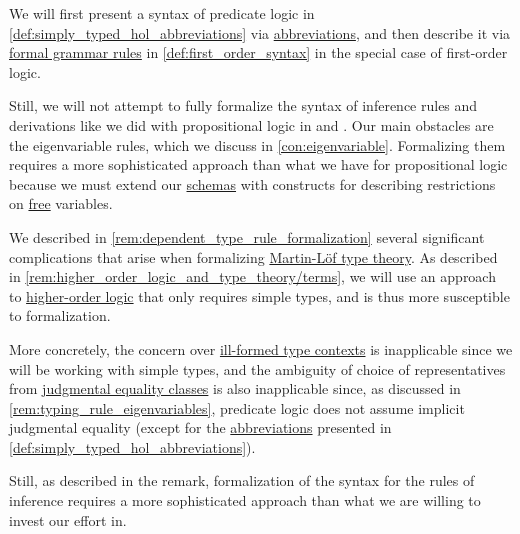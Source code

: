 \begin{remark}\label{rem:predicate_logic_formalization}
  We will first present a syntax of predicate logic in \cref{def:simply_typed_hol_abbreviations} via \hyperref[con:metalingual_abbreviation]{abbreviations}, and then describe it via \hyperref[def:formal_grammar]{formal grammar rules} in \cref{def:first_order_syntax} in the special case of first-order logic.

  Still, we will not attempt to fully formalize the syntax of inference rules and derivations like we did with propositional logic in  and . Our main obstacles are the eigenvariable rules, which we discuss in \cref{con:eigenvariable}. Formalizing them requires a more sophisticated approach than what we have for propositional logic because we must extend our \hyperref[con:schemas_and_instances]{schemas} with constructs for describing restrictions on \hyperref[con:variable_binding]{free} variables.
\end{remark}
\begin{comments}
  \item We described in \cref{rem:dependent_type_rule_formalization} several significant complications that arise when formalizing \hyperref[def:mltt]{Martin-L\"of type theory}. As described in \cref{rem:higher_order_logic_and_type_theory/terms}, we will use an approach to \hyperref[rem:predicate_logic]{higher-order logic} that only requires simple types, and is thus more susceptible to formalization.

  More concretely, the concern over \hyperref[rem:well_formed_contexts]{ill-formed type contexts} is inapplicable since we will be working with simple types, and the ambiguity of choice of representatives from \hyperref[con:equality]{judgmental equality classes} is also inapplicable since, as discussed in \cref{rem:typing_rule_eigenvariables}, predicate logic does not assume implicit judgmental equality (except for the \hyperref[con:metalingual_abbreviation]{abbreviations} presented in \cref{def:simply_typed_hol_abbreviations}).

  Still, as described in the remark, formalization of the syntax for the rules of inference requires a more sophisticated approach than what we are willing to invest our effort in.
\end{comments}

